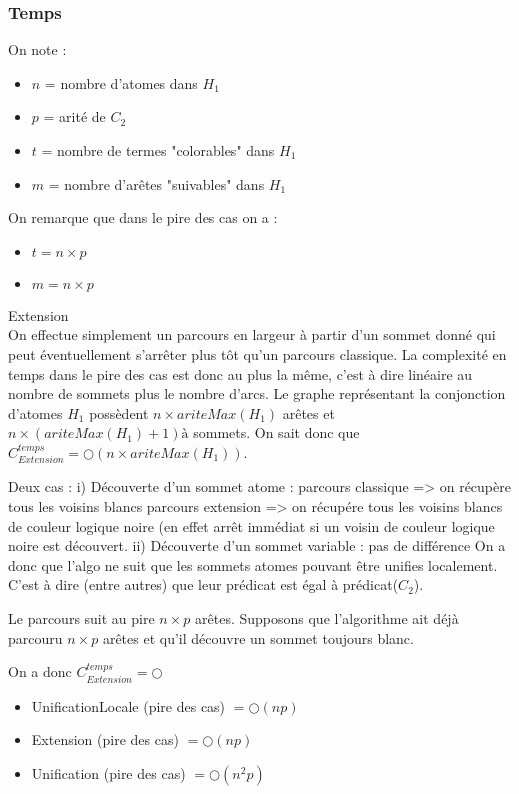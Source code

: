 \subsubsection{Temps}
	On note :
	\begin{itemize}
		\item $n$ = nombre d'atomes dans $H_{1}$
		\item $p$ = arit\'e de $C_{2}$
		\item $t$ = nombre de termes "colorables" dans $H_{1}$
		\item $m$ = nombre d'ar\^etes "suivables" dans $H_{1}$
	\end{itemize}
	
	On remarque que dans le pire des cas on a :
	\begin{itemize}
		\item $t = n \times p$
		\item $m = n \times p$
	\end{itemize}


	Extension\\
	On effectue simplement un parcours en largeur \`a partir d'un sommet donn\'e qui peut \'eventuellement s'arr\^eter plus
	t\^ot qu'un parcours classique. La complexit\'e en temps dans le pire des cas est donc au plus la m\^eme, c'est \`a dire lin\'eaire
	au nombre de sommets plus le nombre d'arcs. Le graphe repr\'esentant la conjonction d'atomes $H_{1}$ poss\`edent $n \times ariteMax(H_{1})$ ar\^etes
	et $n \times (ariteMax(H_{1}) + 1)à$ sommets.
	On sait donc que $C_{Extension}^{temps} = \bigcirc(n \times ariteMax(H_1))$.


	Deux cas :
		i) D\'ecouverte d'un sommet atome :
			parcours classique => on r\'ecup\`ere tous les voisins blancs
			parcours extension => on r\'ecup\'ere tous les voisins blancs de couleur logique noire (en effet arr\^et imm\'ediat si un voisin de couleur logique noire est d\'ecouvert.
		ii) D\'ecouverte d'un sommet variable :
			pas de diff\'erence
	On a donc que l'algo ne suit que les sommets atomes pouvant \^etre unifies localement. C'est \`a dire (entre autres) que leur pr\'edicat est \'egal \`a pr\'edicat($C_{2}$).



	Le parcours suit au pire $n \times p$ ar\^etes.
	Supposons que l'algorithme ait d\'ej\`a parcouru $n \times p$ ar\^etes et qu'il d\'ecouvre un sommet toujours blanc.



	On a donc $C_{Extension}^{temps} = \bigcirc$

	\begin{itemize}
		\item UnificationLocale (pire des cas) $= \bigcirc(np)$
		\item Extension (pire des cas) $= \bigcirc(np)$
		\item Unification (pire des cas) $= \bigcirc(n^{2}p)$
	\end{itemize}

